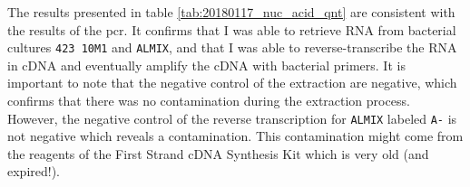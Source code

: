 The results presented in table \ref{tab:20180117_nuc_acid_qnt} are consistent with the results of the \gls{pcr}. It confirms that I was able to retrieve RNA from bacterial cultures \texttt{423 10M1} and \texttt{ALMIX}, and that I was able to reverse-transcribe the RNA in cDNA and eventually amplify the cDNA with bacterial primers. It is important to note that the negative control of the extraction are negative, which confirms that there was no contamination during the extraction process. However, the negative control of the reverse transcription for \texttt{ALMIX} labeled \texttt{A-} is not negative which reveals a contamination. This contamination might come from the reagents of the First Strand cDNA Synthesis Kit which is very old (and expired!).

